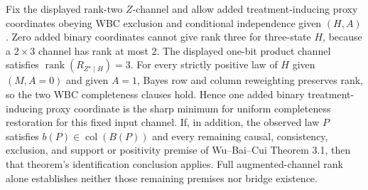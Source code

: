 Fix the displayed rank-two \(Z\)-channel and allow added treatment-inducing proxy coordinates obeying WBC exclusion and conditional independence given \((H,A)\). Zero added binary coordinates cannot give rank three for three-state \(H\), because a \(2\times3\) channel has rank at most \(2\). The displayed one-bit product channel satisfies \(\operatorname{rank}(R_{Z^{\star}\mid H})=3\). For every strictly positive law of \(H\) given \((M,A=0)\) and given \(A=1\), Bayes row and column reweighting preserves rank, so the two WBC completeness clauses hold. Hence one added binary treatment-inducing proxy coordinate is the sharp minimum for uniform completeness restoration for this fixed input channel. If, in addition, the observed law \(P\) satisfies \(b(P)\in\operatorname{col}(B(P))\) and every remaining causal, consistency, exclusion, and support or positivity premise of Wu--Bai--Cui Theorem 3.1, then that theorem's identification conclusion applies. Full augmented-channel rank alone establishes neither those remaining premises nor bridge existence.